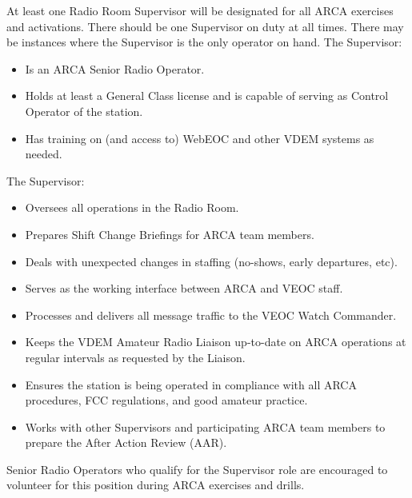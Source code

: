 \documentclass[pdflatex,letterpaper,twoside,12pt]{book}
\begin{document}
At least one Radio Room Supervisor will be designated for all ARCA exercises and activations.  There should be one Supervisor on duty at all times.  There may be instances where the Supervisor is the only operator on hand.  The Supervisor:

\begin{itemize}
	\item Is an ARCA Senior Radio Operator.
	\item Holds at least a General Class license and is capable of serving as Control Operator of the station.
	\item Has training on (and access to) WebEOC and other VDEM systems as needed.
\end{itemize}

The Supervisor:

\begin{itemize}
	\item Oversees all operations in the Radio Room.
	\item Prepares Shift Change Briefings for ARCA team members.
	\item Deals with unexpected changes in staffing (no-shows, early departures, etc).
	\item Serves as the working interface between ARCA and VEOC staff.
	\item Processes and delivers all message traffic to the VEOC Watch Commander.
	\item Keeps the VDEM Amateur Radio Liaison up-to-date on ARCA operations at regular intervals as requested by the Liaison.
	\item Ensures the station is being operated in compliance with all ARCA procedures, FCC regulations, and good amateur practice.
	\item Works with other Supervisors and participating ARCA team members to prepare the After Action Review (AAR).
\end{itemize}

Senior Radio Operators who qualify for the Supervisor role are encouraged to volunteer for this position during ARCA exercises and drills.

\end{document}
